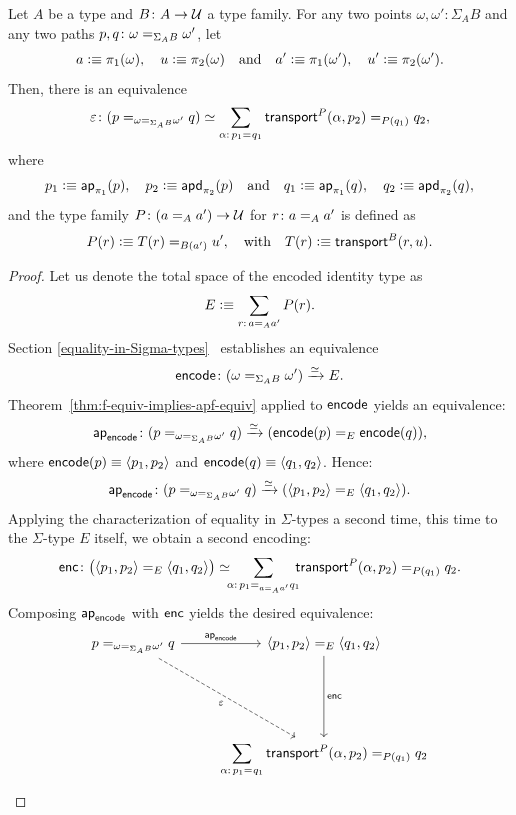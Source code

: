 \begin{rem}
\begin{thm}\label{thm:transport-in-Sigma-identity}
    Let\/ $A$ be a type and\/ $B\colon A\to\univ$ a type family. For any two points\/ $\omega,\omega'\colon\Sigma_AB$ and any two paths\/ $p,q\colon\omega\eq{\Sigma_AB}\omega'$, let
    \[
        a\mathrel{\vcentcolon}\equiv\pi_1(\omega),\quad u\mathrel{\vcentcolon}\equiv\pi_2(\omega)
        \quad\text{and}\quad
        a'\mathrel{\vcentcolon}\equiv\pi_1(\omega'),\quad u'\mathrel{\vcentcolon}\equiv\pi_2(\omega').
    \]
    Then, there is an equivalence
    \[
        \varepsilon\colon
        (p\eq{\omega\eq{\Sigma_AB}\omega'}q)
            \simeq
            \sum_{\alpha\colon p_1\eq{}q_1}
                \fun{transport}^P(\alpha, p_2)\eq{P(q_1)} q_2,
    \]
    where
    \[
        p_1\mathrel{\vcentcolon}\equiv\mathsf{ap}_{\pi_1}(p),
            \quad p_2\mathrel{\vcentcolon}\equiv\mathsf{apd}_{\pi_2}(p)
        \quad\text{and}\quad
        q_1\mathrel{\vcentcolon}\equiv\mathsf{ap}_{\pi_1}(q),
        \quad q_2\mathrel{\vcentcolon}\equiv\mathsf{apd}_{\pi_2}(q),
    \]
    and the type family\/ $P\colon(a\eq Aa')\to\univ$ for\/ $r\colon a\eq Aa'$ is defined as
    \[
        P(r)\mathrel{\vcentcolon}\equiv T(r)\mathrel{=_{B(a')}}u',
        \quad\text{with}\quad
        T(r)\mathrel{\vcentcolon}\equiv\mathsf{transport}^B(r,u).
    \]
\end{thm}

\begin{proof}
    Let us denote the total space of the encoded identity type as
    \[
        E\defeq\sum_{r\colon a\eq Aa'}P(r).
    \]
    Section \ref{equality-in-Sigma-types}~ establishes an equivalence
    \[
        \fun{encode}\colon(\omega\eq{\Sigma_AB}\omega')
            \xrightarrow\simeq E.
    \]
    Theorem~\ref{thm:f-equiv-implies-apf-equiv} applied to $\mathsf{encode}$ yields an equivalence:
    \[
        \fun{ap}_{\fun{encode}}\colon(p\eq{\omega\eq{\Sigma_AB}\omega'}q)
        \xrightarrow\simeq
        (\fun{encode}(p)\eq E\fun{encode}(q)),
    \]
    where $\mathsf{encode}(p)\equiv\langle p_1,p_2\rangle$ and $\mathsf{encode}(q)\equiv\langle q_1,q_2\rangle$. Hence:
    \[
        \fun{ap}_{\fun{encode}}\colon
            (p\eq{\omega\eq{\Sigma_AB}\omega'}q)
            \xrightarrow\simeq
            (\dep{p_1,p_2}\eq E\dep{q_1,q_2}).
    \]
    Applying the characterization of equality in $\Sigma$-types a second time, this time to the $\Sigma$-type $E$ itself, we obtain a second encoding:
    \[
        \fun{enc}\colon\bigl(\dep{p_1, p_2}
        \eq E\dep{q_1,q_2}\bigr)
        \simeq
        \!\!\!
        \sum_{\alpha\colon p_1\eq{a\eq Aa'}q_1}
        \!\!\!\fun{transport}^P(\alpha,p_2)\eq{P(q_1)}q_2.
    \]
    Composing $\mathsf{ap}_{\mathsf{encode}}$ with $\mathsf{enc}$ yields the desired equivalence:
    \[
        \begin{tikzcd}[row sep=2cm]
            p\eq{\omega\eq{\Sigma_AB}\omega'}q
                    \arrow[r,"\fun{ap}_{\fun{encode}}"]
                    \arrow[rd,dashed,"\varepsilon"']
                &\dep{p_1,p_2}\eq E\dep{q_1,q_2}
                    \arrow[d,"\fun{enc}"]\\
                &{\displaystyle\sum_{\alpha\colon p_1\eq{}q_1}
                    \fun{transport}^P(\alpha,p_2)\eq{P(q_1)}q_2}
        \end{tikzcd}
    \]
\end{proof}


\end{rem}
